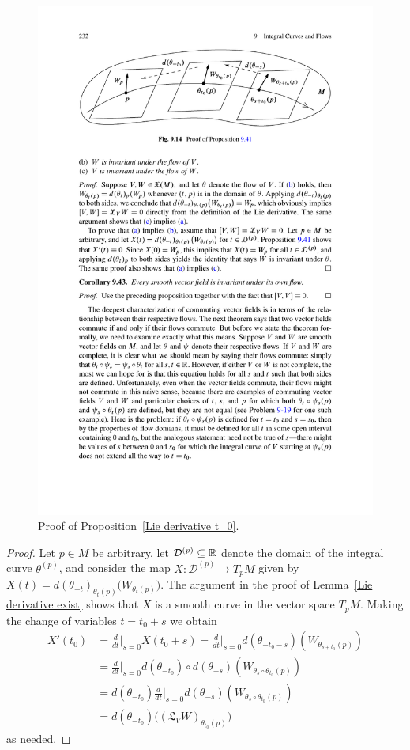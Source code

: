 \begin{figure}[htbp]
\centering
\includegraphics{pictures/Lie-derivative-2}
\caption{Proof of Proposition~\ref{Lie derivative t_0}.}
\end{figure}
\begin{proof}
Let $p\in M$ be arbitrary, let $\mathcal{D}^{(p)}\subseteq\mathbb{R}$ denote the domain of the integral curve $\theta^{(p)}$, and consider the map $X:\mathcal{D}^{(p)}\to T_pM$ given by $X(t)=d(\theta_{-t})_{\theta_t(p)}\big(W_{\theta_t(p)}\big)$. The argument in the proof of Lemma~\ref{Lie derivative exist} shows that $X$ is a smooth curve in the vector space $T_pM$. Making the change of variables $t=t_0+s$ we obtain
\begin{align*}
X'(t_0)&=\frac{d}{dt}\Big|_{s=0}X(t_0+s)=\frac{d}{dt}\Big|_{s=0}d(\theta_{-t_0-s})(W_{\theta_{s+t_0}(p)})\\
&=\frac{d}{dt}\Big|_{s=0}d(\theta_{-t_0})\circ d(\theta_{-s})(W_{\theta_{s}\circ\theta_{t_0}(p)})\\
&=d(\theta_{-t_0})\frac{d}{dt}\Big|_{s=0}d(\theta_{-s})(W_{\theta_{s}\circ\theta_{t_0}(p)})\\
&=d(\theta_{-t_0})\big((\mathfrak{L}_VW)_{\theta_{t_0}(p)}\big)
\end{align*}
as needed.
\end{proof}
